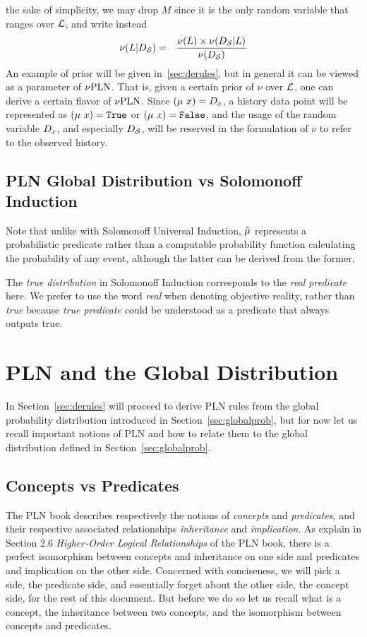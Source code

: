 \documentclass[]{article}
\begin{document}
the sake of simplicity, we may drop $M$ since it is the only random
variable that ranges over $\mathcal{L}$, and write instead
\begin{eqnarray}
  \nu(L | D_{\mathcal{S}})
  & = &
  \frac{\nu(L) \times \nu(D_{\mathcal{S}} | L)}{\nu(D_{\mathcal{S}})}
\end{eqnarray}
An example of prior will be given in~\ref{sec:derules}, but in general
it can be viewed as a parameter of $\nu\textup{PLN}$.  That is, given a certain
prior of $\nu$ over $\mathcal{L}$, one can derive a certain flavor of
$\nu\textup{PLN}$.  Since $(\mu\ x) = D_{x}$, a history data point will be
represented as $(\mu\ x) = \texttt{True}$ or $(\mu\ x) = \texttt{False}$, and the usage of
the random variable $D_{x}$, and especially $D_{\mathcal{S}}$, will be
reserved in the formulation of $\nu$ to refer to the observed history.

\subsection{PLN Global Distribution vs Solomonoff Induction}
Note that unlike with Solomonoff Universal Induction, $\hat{\mu}$
represents a probabilistic predicate rather than a computable
probability function calculating the probability of any event,
although the latter can be derived from the former.

The \emph{true distribution} in Solomonoff Induction corresponds to
the \emph{real predicate} here.  We prefer to use the word \emph{real}
when denoting objective reality, rather than \emph{true} because
\emph{true predicate} could be understood as a predicate that always
outputs true.

\section{PLN and the Global Distribution}
In Section~\ref{sec:derules} will proceed to derive PLN rules from the
global probability distribution introduced in
Section~\ref{sec:globalprob}, but for now let us recall important
notions of PLN and how to relate them to the global distribution
defined in Section~\ref{sec:globalprob}.

\subsection{Concepts vs Predicates}
The PLN book describes respectively the notions of \emph{concepts} and
\emph{predicates}, and their respective associated relationships
\emph{inheritance} and \emph{implication}.  As explain in Section 2.6
\emph{Higher-Order Logical Relationships} of the PLN book, there is a
perfect isomorphism between concepts and inheritance on one side and
predicates and implication on the other side.  Concerned with
conciseness, we will pick a side, the predicate side, and essentially
forget about the other side, the concept side, for the rest of this
document.  But before we do so let us recall what is a concept, the
inheritance between two concepts, and the isomorphism between concepts
and predicates.
\end{document}
